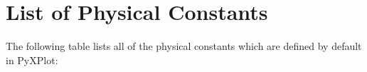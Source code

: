 %
%
%
%
%



\chapter{List of Physical Constants}
\label{ch:constants}

The following table lists all of the physical constants which are defined by default in PyXPlot:

